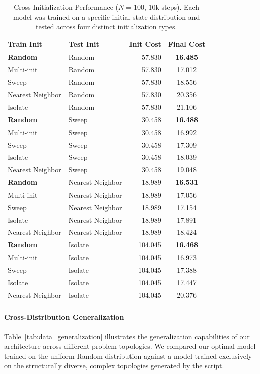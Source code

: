 \documentclass[letterpaper]{article} %
\begin{document}
\begin{table}[h]
\centering
\small
\caption{Cross-Initialization Performance ($N=100$, 10k steps). Each model was trained on a specific initial state distribution and tested across four distinct initialization types.}
\label{tab:init_generalization}
\begin{tabular}{l l r c}
\toprule
\textbf{Train Init} & \textbf{Test Init} & \textbf{Init Cost} & \textbf{Final Cost} \\
\midrule
\textbf{Random} & Random & 57.830 & \textbf{16.485} \\
Multi-init & Random & 57.830 & 17.012 \\
Sweep & Random & 57.830 & 18.556 \\
Nearest Neighbor & Random & 57.830 & 20.356 \\
Isolate & Random & 57.830 & 21.106 \\
\midrule
\textbf{Random} & Sweep  & 30.458 & \textbf{16.488} \\
Multi-init & Sweep  & 30.458 & 16.992 \\
Sweep & Sweep  & 30.458 & 17.309 \\
Isolate & Sweep  & 30.458 & 18.039 \\
Nearest Neighbor & Sweep  & 30.458 & 19.048 \\
\midrule
\textbf{Random} & Nearest Neighbor & 18.989 & \textbf{16.531} \\
Multi-init & Nearest Neighbor & 18.989 & 17.056 \\
Sweep & Nearest Neighbor & 18.989 &  17.154 \\
Isolate & Nearest Neighbor & 18.989 & 17.891 \\
Nearest Neighbor & Nearest Neighbor & 18.989 & 18.424 \\
\midrule
\textbf{Random} & Isolate & 104.045 & \textbf{16.468} \\
Multi-init & Isolate & 104.045 & 16.973 \\
Sweep & Isolate & 104.045 & 17.388 \\
Isolate & Isolate & 104.045 & 17.447 \\
Nearest Neighbor & Isolate & 104.045 & 20.376 \\
\bottomrule
\end{tabular}
\end{table}

\paragraph{Cross-Distribution Generalization}
Table~\ref{tab:data_generalization} illustrates the generalization capabilities of our architecture across different problem topologies. We compared our optimal model trained on the uniform Random distribution \cite{nazari_reinforcement_2018} against a model trained exclusively on the structurally diverse, complex topologies generated by the \cite{queiroga_10000_nodate} script.
\end{document}
